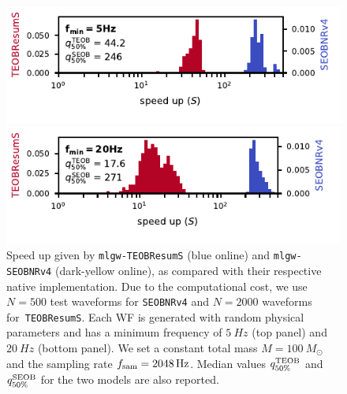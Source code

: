 \documentclass[twocolumn,showpacs,preprintnumbers,nofootinbib,prd,
superscriptaddress,10pt]{revtex4-1}
\begin{document}
\newcommand{\factor}{.9}
\begin{figure}
	\centering
	\begin{minipage}{\factor\linewidth}
	    \includegraphics[width=\linewidth]{img/compare_time_hist_5.pdf}
	\end{minipage}\hfill
	\begin{minipage}{\factor\linewidth}
	    \includegraphics[width=\linewidth]{img/compare_time_hist_20.pdf}
	\end{minipage}

	\caption{
Speed up given by \texttt{mlgw-TEOBResumS} (blue online) and \texttt{mlgw-SEOBNRv4} (dark-yellow online), 
as compared with their respective native implementation. 
Due to the computational cost, we use $N=500$ test waveforms for \texttt{SEOBNRv4} 
and $N=2000$ waveforms for~\texttt{TEOBResumS}. Each WF is generated with random physical 
parameters and has a minimum frequency of $\SI{5}{Hz}$ (top panel) and $\SI{20}{Hz}$ (bottom panel).
We set a constant total mass $M=\SI{100}{M_\odot}$ and the sampling rate $f_{\rm sam} = \SI{2048}{Hz}$.
Median values $q^{\rm TEOB}_{50\%}$ and $q^{\rm SEOB}_{50\%}$ for the two models are also reported.
}
	\label{fig:time_performance_hist}
\end{figure}
\end{document}
